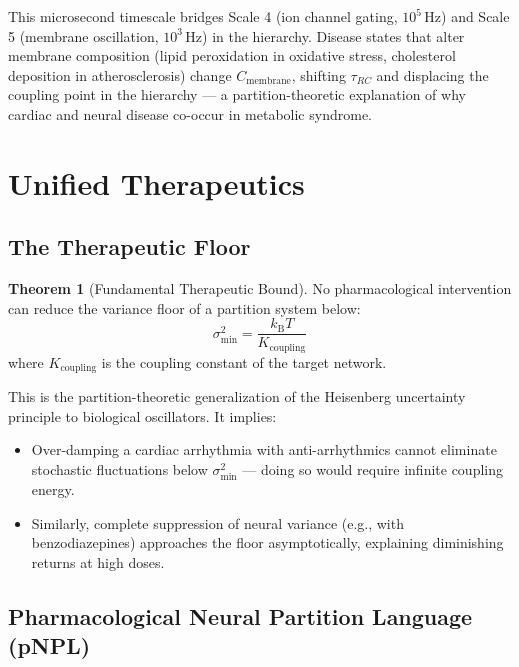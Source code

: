 \documentclass[12pt,a4paper]{article}
\theoremstyle{definition}
\newtheorem{theorem}{Theorem}
\newcommand{\kBT}{k_{\text{B}}T}
\begin{document}
This microsecond timescale bridges Scale 4 (ion channel gating, $10^5$\,Hz) and
Scale 5 (membrane oscillation, $10^3$\,Hz) in the hierarchy. Disease states
that alter membrane composition (lipid peroxidation in oxidative stress,
cholesterol deposition in atherosclerosis) change $C_{\text{membrane}}$,
shifting $\tau_{RC}$ and displacing the coupling point in the hierarchy —
a partition-theoretic explanation of why cardiac and neural disease
co-occur in metabolic syndrome.

\section{Unified Therapeutics}
\label{sec:therapeutics}

\subsection{The Therapeutic Floor}

\begin{theorem}[Fundamental Therapeutic Bound]
No pharmacological intervention can reduce the variance floor of a
partition system below:
\begin{equation}
\boxed{\sigma^2_{\min} = \frac{\kBT}{K_{\text{coupling}}}}
\end{equation}
where $K_{\text{coupling}}$ is the coupling constant of the target network.
\end{theorem}

This is the partition-theoretic generalization of the Heisenberg uncertainty
principle to biological oscillators. It implies:
\begin{itemize}
\item Over-damping a cardiac arrhythmia with anti-arrhythmics cannot
  eliminate stochastic fluctuations below $\sigma^2_{\min}$ — doing so
  would require infinite coupling energy.
\item Similarly, complete suppression of neural variance (e.g., with
  benzodiazepines) approaches the floor asymptotically, explaining
  diminishing returns at high doses.
\end{itemize}

\subsection{Pharmacological Neural Partition Language (pNPL)}
\end{document}
